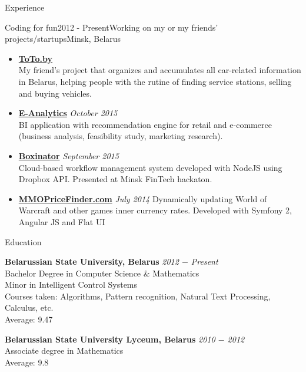 \documentclass{resume} %
\begin{document}
\begin{rSection}{Experience}

\begin{rSubsection}{Coding for fun}{2012 - Present}{Working on my or my friends' projects/startups}{Minsk, Belarus}

\begin{itemize}[leftmargin=*,label={$+$}]
  \item {\bf \href{http://toto.by}{ToTo.by}} \\ 
	My friend's project that organizes and accumulates all car-related information in Belarus, helping people with the rutine of finding service stations, selling and buying vehicles.

  \item {\bf \href{http://pirateminds.com/e-analytics}{E-Analytics}} \hfill {\em October 2015} \\ 
	BI application with recommendation engine for retail and e-commerce (business analysis, feasibility study, marketing research).

  \item {\bf \href{http://boxinator.xyz}{Boxinator}} \hfill {\em September 2015} \\ 
	Cloud-based workflow management system developed with NodeJS using Dropbox API. Presented at Minsk FinTech hackaton.

  \item {\bf \href{http://mmopricefinder.com}{MMOPriceFinder.com}} \hfill {\em July 2014} 
	Dynamically updating World of Warcraft and other games inner currency rates. Developed with Symfony 2, Angular JS and Flat UI \\
\end{itemize}

\end{rSubsection}

\end{rSection}



\begin{rSection}{Education}

{\bf Belarussian State University, Belarus} \hfill {\em 2012 $-$ Present} \\ 
Bachelor Degree in Computer Science \& Mathematics \\
Minor in Intelligent Control Systems \smallskip \\
Courses taken: Algorithms, Pattern recognition, Natural Text Processing, Calculus, etc. \smallskip \\
Average: 9.47

{\bf Belarussian State University Lyceum, Belarus} \hfill {\em 2010 $-$ 2012} \\ 
Associate degree in Mathematics \\
Average: 9.8

\end{rSection}
\end{document}
